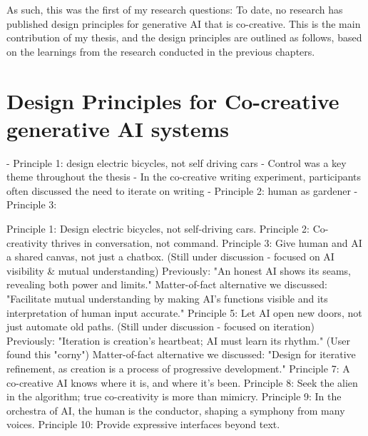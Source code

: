 As such, this was the first of my research questions:
To date, no research has published design principles for generative AI that is co-creative. This is the main contribution of my thesis, and the design principles are outlined as follows, based on the learnings from the research conducted in the previous chapters. 

\section{Design Principles for Co-creative generative AI systems}

- Principle 1: design electric bicycles, not self driving cars
    -  Control was a key theme throughout the thesis
    -  In the co-creative writing experiment, participants often discussed the need to iterate on writing
- Principle 2: human as gardener
- Principle 3: 

Principle 1: Design electric bicycles, not self-driving cars.
Principle 2: Co-creativity thrives in conversation, not command.
Principle 3: Give human and AI a shared canvas, not just a chatbox.
(Still under discussion - focused on AI visibility & mutual understanding)
Previously: "An honest AI shows its seams, revealing both power and limits."
Matter-of-fact alternative we discussed: "Facilitate mutual understanding by making AI's functions visible and its interpretation of human input accurate."
Principle 5: Let AI open new doors, not just automate old paths.
(Still under discussion - focused on iteration)
Previously: "Iteration is creation's heartbeat; AI must learn its rhythm." (User found this "corny")
Matter-of-fact alternative we discussed: "Design for iterative refinement, as creation is a process of progressive development."
Principle 7: A co-creative AI knows where it is, and where it's been.
Principle 8: Seek the alien in the algorithm; true co-creativity is more than mimicry.
Principle 9: In the orchestra of AI, the human is the conductor, shaping a symphony from many voices.
Principle 10: Provide expressive interfaces beyond text.